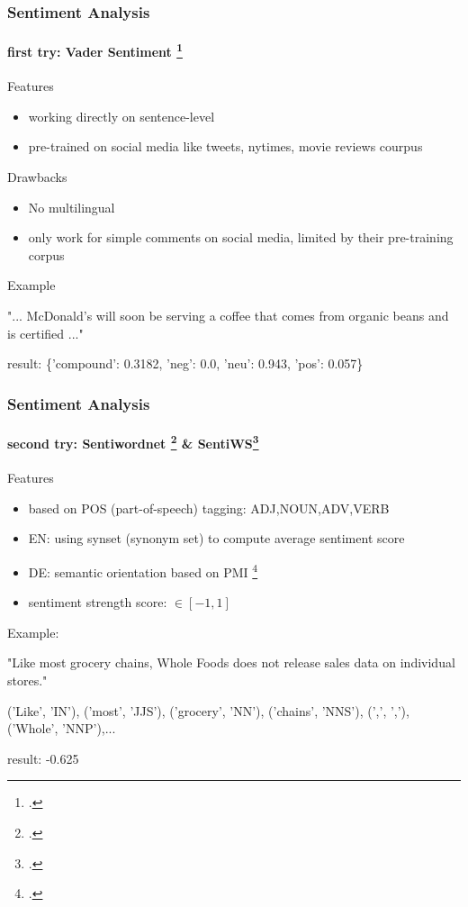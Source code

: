 \documentclass{tum-presentation}
\begin{document}
\begin{frame}
  \frametitle{Sentiment Analysis}
  \framesubtitle{first try: Vader Sentiment \footcite{hutto2014vader}}
  \begin{description}
    \large
    \item Features
    \item \begin{itemize}
      \item  working directly on sentence-level 
      \item  pre-trained on social media like tweets, nytimes, movie reviews courpus 
    \end{itemize}
    \vspace{0.2cm}
    \item Drawbacks
    \item \begin{itemize}
      \item  No multilingual
      \item  only work for simple comments on social media, limited by their pre-training corpus
    \end{itemize}
    \vspace{0.2cm}
    \item Example
    \item "... McDonald's will soon be serving a coffee that comes from organic beans and is certified ..." 
    \item result: \{'compound': 0.3182, 'neg': 0.0, 'neu': 0.943, 'pos': 0.057\}
  \end{description}
\end{frame}

\begin{frame}
  \frametitle{Sentiment Analysis}
  \framesubtitle{second try: Sentiwordnet \footcite{minemyopinion} \&  SentiWS\footcite{remus2010sentiws}}     
  \begin{description}
    \large
    \item Features
    \item \begin{itemize}
      \item  based on POS (part-of-speech) tagging: ADJ,NOUN,ADV,VERB
      \item  EN: using synset (synonym set) to compute average sentiment score
      \item  DE: semantic orientation based on PMI \footcite{remus2010sentiws}    
      \item  sentiment strength score:  $\in [-1,1]$ 
    \end{itemize}
    \vspace{0.2cm}
    \item Example:
    \item "Like most grocery chains, Whole Foods does not release sales data on individual stores." 
    \item ('Like', 'IN'), ('most', 'JJS'), ('grocery', 'NN'), ('chains', 'NNS'), (',', ','), ('Whole', 'NNP'),...
    \item result: -0.625
  \end{description}
\end{frame}
\end{document}
